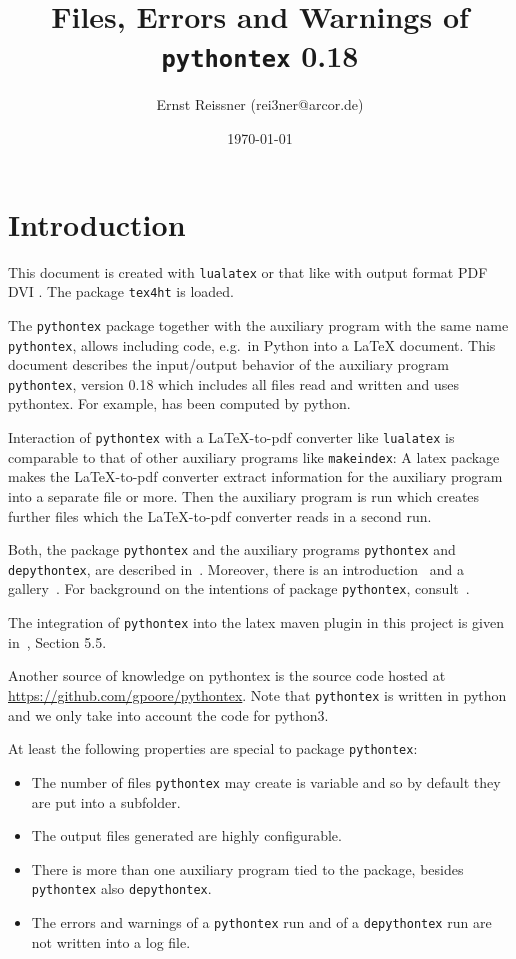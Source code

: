 \documentclass[a4paper]{article}%
\title{Files, Errors and Warnings of \texttt{pythontex} 0.18 }
\author{Ernst Reissner (rei3ner@arcor.de)}
\date{\today}
\newcommand{\lualatex}{\texttt{lualatex}}
\newcommand{\makeIndex}{\texttt{makeindex}}
\newcommand{\pytex}{\texttt{pythontex}}
\newcommand{\Ppytex}{package \texttt{pythontex}}
\newcommand{\pytexP}{\texttt{pythontex} package}
\newcommand{\dpytex}{\texttt{depythontex}}
\begin{document}
\maketitle
\tableofcontents
\listoffigures
\listoftables
\lstlistoflistings%

\section{Introduction}

This document is created with \lualatex{} or that like 
with output format 
\ifpdf%
PDF%
\else
DVI%
\fi.
The package \texttt{tex4ht} 
is  loaded. 

The \pytexP{} together with the auxiliary program with the same name \pytex{}, 
allows including code, e.g.~in Python into a \LaTeX{} document. 
This document describes the input/output behavior of the auxiliary program \pytex{}, version 0.18
which includes all files read and written and uses pythontex. 
For example, \texttt{} has been computed by python. 

Interaction of \pytex{} with a \LaTeX-to-pdf converter like \lualatex{} 
is comparable to that of other auxiliary programs like \makeIndex: 
A latex package makes the \LaTeX-to-pdf converter extract information for the auxiliary program 
into a separate file or more. 
Then the auxiliary program is run which creates further files 
which the \LaTeX-to-pdf converter reads in a second run. 

Both, the package \texttt{pythontex} and the auxiliary programs \pytex{} and \dpytex{}, 
are described in~\cite{PythonTexP}. 
Moreover, there is an introduction~\cite{PythonTexQ} and a gallery~\cite{PythonTexG}. 
For background on the intentions of package \texttt{pythontex}, consult~\cite{PythonTexRepr}. 

The integration of \texttt{pythontex} into the latex maven plugin in this project 
is given in~\cite{LatexPlugin}, Section 5.5. 

Another source of knowledge on pythontex is the source code hosted at 
\url{https://github.com/gpoore/pythontex}. 
Note that \texttt{pythontex} is written in python and we only take into account the code for python3. 

At least the following properties are special to \Ppytex: 
%
\begin{itemize}
  \item The number of files \pytex{} may create is variable 
  and so by default they are put into a subfolder. 
  \item The output files generated are highly configurable. 
  \item There is more than one auxiliary program tied to the package, besides \pytex{} also \dpytex{}. 
  \item The errors and warnings of a \pytex{} run and of a \dpytex{} run are not written into a log file. 
\end{itemize}
\end{document}
